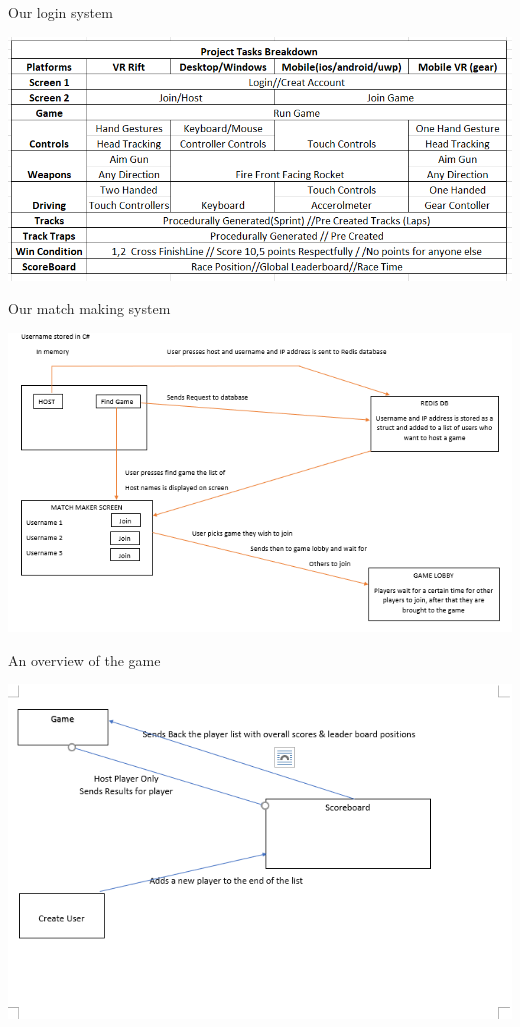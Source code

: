 Our login system

\includegraphics[width=1\columnwidth]{img/breakdown.PNG}

Our match making system

\includegraphics[width=1\columnwidth]{img/redisMatch.PNG}

An overview of the game

\includegraphics[width=1\columnwidth]{img/MariaDBPic.PNG}

